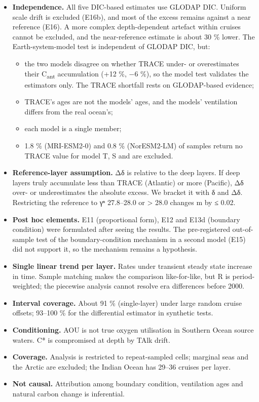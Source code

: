 \documentclass[11pt]{article}
\providecommand{\tightlist}{\setlength{\itemsep}{0pt}\setlength{\parskip}{0pt}}
\begin{document}
\begin{itemize}
\tightlist
\item
  \textbf{Independence.} All five DIC-based estimates use GLODAP DIC.
  Uniform scale drift is excluded (E16b), and most of the excess remains
  against a near reference (E16). A more complex depth-dependent
  artefact within cruises cannot be excluded, and the near-reference
  estimate is about 30 \% lower. The Earth-system-model test is
  independent of GLODAP DIC, but:

  \begin{itemize}
  \tightlist
  \item
    the two models disagree on whether TRACE under- or overestimates
    their C\textsubscript{ant} accumulation (+12 \%, −6 \%), so the
    model test validates the estimators only. The TRACE shortfall rests
    on GLODAP-based evidence;
  \item
    TRACE's ages are not the models' ages, and the models' ventilation
    differs from the real ocean's;
  \item
    each model is a single member;
  \item
    1.8 \% (MRI-ESM2-0) and 0.8 \% (NorESM2-LM) of samples return no
    TRACE value for model T, S and are excluded.
  \end{itemize}
\item
  \textbf{Reference-layer assumption.} Δδ is relative to the deep
  layers. If deep layers truly accumulate less than TRACE (Atlantic) or
  more (Pacific), Δδ over- or underestimates the absolute excess. We
  bracket it with δ and Δδ. Restricting the reference to γⁿ 27.8--28.0
  or \textgreater{} 28.0 changes m by ≤ 0.02.
\item
  \textbf{Post hoc elements.} E11 (proportional form), E12 and E13d
  (boundary condition) were formulated after seeing the results. The
  pre-registered out-of-sample test of the boundary-condition mechanism
  in a second model (E15) did not support it, so the mechanism remains a
  hypothesis.
\item
  \textbf{Single linear trend per layer.} Rates under transient steady
  state increase in time. Sample matching makes the comparison
  like-for-like, but R is period-weighted; the piecewise analysis cannot
  resolve era differences before 2000.
\item
  \textbf{Interval coverage.} About 91 \% (single-layer) under large
  random cruise offsets; 93--100 \% for the differential estimator in
  synthetic tests.
\item
  \textbf{Conditioning.} AOU is not true oxygen utilisation in Southern
  Ocean source waters. C* is compromised at depth by TAlk drift.
\item
  \textbf{Coverage.} Analysis is restricted to repeat-sampled cells;
  marginal seas and the Arctic are excluded; the Indian Ocean has 29--36
  cruises per layer.
\item
  \textbf{Not causal.} Attribution among boundary condition, ventilation
  ages and natural carbon change is inferential.
\end{itemize}
\end{document}
